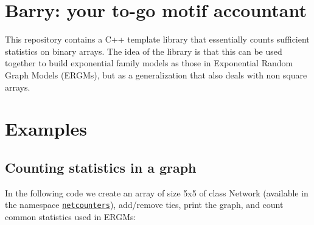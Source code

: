 \href{https://travis-ci.com/USCbiostats/barry}{\tt } \href{https://image.usc.edu}{\tt }

\section*{Barry\+: your to-\/go motif accountant}

This repository contains a C++ template library that essentially counts sufficient statistics on binary arrays. The idea of the library is that this can be used together to build exponential family models as those in Exponential Random Graph Models (E\+R\+G\+Ms), but as a generalization that also deals with non square arrays.

\section*{Examples}

\subsection*{Counting statistics in a graph}

In the following code we create an array of size 5x5 of class {\ttfamily Network} (available in the namespace \href{https://uscbiostats.github.io/barry/namespacebarry_1_1counters_1_1network.html}{\tt netcounters}), add/remove ties, print the graph, and count common statistics used in E\+R\+G\+Ms\+:


